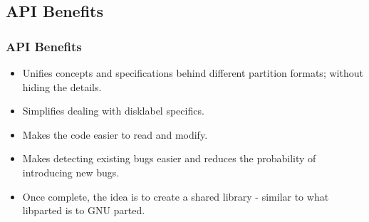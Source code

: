 \subsection{API Benefits}
\begin{frame}\frametitle{API Benefits}
  \begin{itemize}
  \item Unifies concepts and specifications behind different partition formats; without hiding the details.
  \item Simplifies dealing with disklabel specifics.
  \item Makes the code easier to read and modify.
  \item Makes detecting existing bugs easier and reduces the probability of introducing new bugs.
  \item Once complete, the idea is to create a shared library - similar to what libparted is to GNU parted.
  \end{itemize}
\end{frame}
